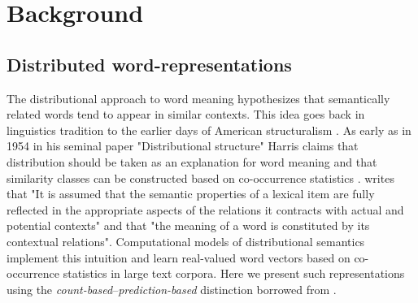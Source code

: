 \begin{comment}
Chapter~\ref{ch:COLI} introduces a recurrent and convolutional neural network
based model that learns from both visual-grounding signals and
word-word co-occurrences. We develop techniques to interpret the learned
representations of such an architecture and investigate if certain linguistic
phenomena is encoded in the learned model.

Chapter~\ref{ch:IJCNLP} provides empirical evidence that grounded learning
can improve machine translation quality.
In Chapter~\ref{ch:ConLL} we show under what conditions multilinguality an help improve grounded
representations.


\end{comment}

\chapter{Background}
\label{ch:background}

\section{Distributed word-representations}
\label{sec:words}
The distributional approach to word meaning hypothesizes that semantically related words
tend to appear in similar contexts. This idea goes back in linguistics tradition to the
earlier days of American structuralism \citep{nevin2002legacy}.
As early as in 1954 in his seminal paper "Distributional structure" Harris claims
that distribution should be taken as an explanation for word meaning and that similarity classes
can be constructed based on co-occurrence statistics \citep{harris1954distributional}.
\cite{cruse1986lexical} writes that "It is  assumed  that  the  semantic properties  of
a lexical  item  are  fully  reflected  in  the  appropriate  aspects  of  the  relations
it  contracts  with  actual  and  potential  contexts" and that "the  meaning  of  a word
is constituted  by  its  contextual  relations". Computational models of distributional
semantics implement this intuition and learn real-valued word vectors based on co-occurrence
statistics in large text corpora. Here we present such representations using the \emph{count-based}--\emph{prediction-based} distinction borrowed from \cite{baroni2014don}.

